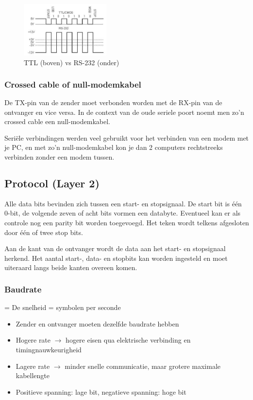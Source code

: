 \documentclass{article}
\begin{document}
\begin{figure}[H]
    \centering
    \includegraphics[width=0.4\textwidth]{ttl-vs-rs232.png}
    \caption{TTL (boven) vs RS-232 (onder)}
\end{figure}

\subsubsection{Crossed cable of null-modemkabel}
De TX-pin van de zender moet verbonden worden met de RX-pin van de ontvanger en vice versa. 
In de context van de oude seriele poort noemt men zo'n crossed cable een null-modemkabel.

Seriële verbindingen werden veel gebruikt voor het verbinden van een modem met je PC, en met zo’n null-modemkabel kon je dan 2 computers rechtstreeks
verbinden zonder een modem tussen.

\subsection{Protocol (Layer 2)}
Alle data bits bevinden zich tussen een start- en stopsignaal. De start bit is één 0-bit, de volgende
zeven of acht bits vormen een databyte. Eventueel kan er als controle nog een parity bit worden
toegevoegd. Het teken wordt telkens afgesloten door één of twee stop bits.

Aan de kant van de ontvanger wordt de data aan het start- en stopsignaal herkend.
Het aantal start-, data- en stopbits kan worden ingesteld en moet uiteraard langs beide kanten overeen komen.

\subsubsection{Baudrate}
= De snelheid = symbolen per seconde

\begin{itemize}
    \item Zender en ontvanger moeten dezelfde baudrate hebben
    \item Hogere rate $\rightarrow$ hogere eisen qua elektrische verbinding en timingnauwkeurigheid
    \item Lagere rate $\rightarrow$ minder snelle communicatie, maar grotere maximale kabellengte
    \item Positieve spanning: lage bit, negatieve spanning: hoge bit
\end{itemize}
\end{document}
